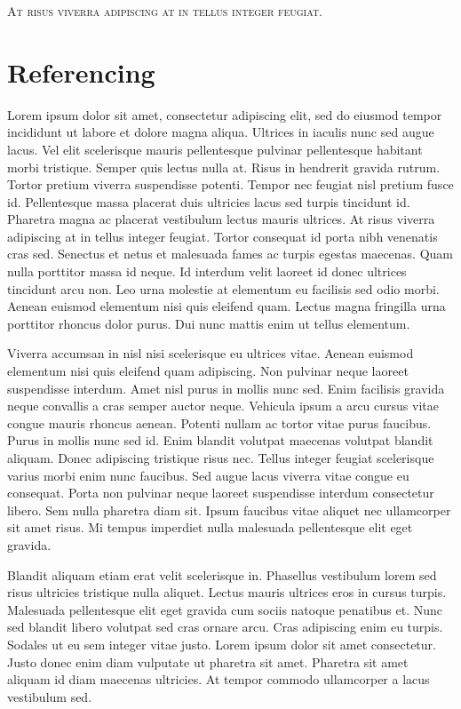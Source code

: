 \documentclass[a4paper, 12pt]{report}
\begin{document}
\textsc{At risus viverra adipiscing at in tellus integer feugiat.}




\chapter{Referencing}
Lorem ipsum dolor sit amet, consectetur adipiscing elit, sed do eiusmod tempor incididunt ut labore et dolore magna aliqua. Ultrices in iaculis nunc sed augue lacus. Vel elit scelerisque mauris pellentesque pulvinar pellentesque habitant morbi tristique. Semper quis lectus nulla at. Risus in hendrerit gravida rutrum. Tortor pretium viverra suspendisse potenti. Tempor nec feugiat nisl pretium fusce id. Pellentesque massa placerat duis ultricies lacus sed turpis tincidunt id. Pharetra magna ac placerat vestibulum lectus mauris ultrices. At risus viverra adipiscing at in tellus integer feugiat. Tortor consequat id porta nibh venenatis cras sed. Senectus et netus et malesuada fames ac turpis egestas maecenas. Quam nulla porttitor massa id neque. Id interdum velit laoreet id donec ultrices tincidunt arcu non. Leo urna molestie at elementum eu facilisis sed odio morbi. Aenean euismod elementum nisi quis eleifend quam. Lectus magna fringilla urna porttitor rhoncus dolor purus. Dui nunc mattis enim ut tellus elementum. \citep{4160265}

Viverra accumsan in nisl nisi scelerisque eu ultrices vitae. Aenean euismod elementum nisi quis eleifend quam adipiscing. Non pulvinar neque laoreet suspendisse interdum. Amet nisl purus in mollis nunc sed. Enim facilisis gravida neque convallis a cras semper auctor neque. Vehicula ipsum a arcu cursus vitae congue mauris rhoncus aenean. Potenti nullam ac tortor vitae purus faucibus. Purus in mollis nunc sed id. Enim blandit volutpat maecenas volutpat blandit aliquam. Donec adipiscing tristique risus nec. Tellus integer feugiat scelerisque varius morbi enim nunc faucibus. Sed augue lacus viverra vitae congue eu consequat. Porta non pulvinar neque laoreet suspendisse interdum consectetur libero. Sem nulla pharetra diam sit. Ipsum faucibus vitae aliquet nec ullamcorper sit amet risus. Mi tempus imperdiet nulla malesuada pellentesque elit eget gravida.\citep{ibm}

Blandit aliquam etiam erat velit scelerisque in. Phasellus vestibulum lorem sed risus ultricies tristique nulla aliquet. Lectus mauris ultrices eros in cursus turpis. Malesuada pellentesque elit eget gravida cum sociis natoque penatibus et. Nunc sed blandit libero volutpat sed cras ornare arcu. Cras adipiscing enim eu turpis. Sodales ut eu sem integer vitae justo. Lorem ipsum dolor sit amet consectetur. Justo donec enim diam vulputate ut pharetra sit amet. Pharetra sit amet aliquam id diam maecenas ultricies. At tempor commodo ullamcorper a lacus vestibulum sed. \citep{clear2018atomic}
\end{document}
